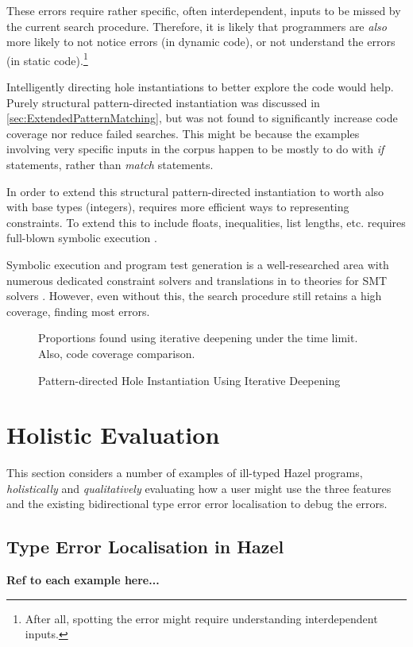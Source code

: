 These errors require rather specific, often interdependent, inputs to be missed by the current search procedure. Therefore, it is likely that programmers are \textit{also} more likely to not notice errors (in dynamic code), or not understand the errors (in static code).\footnote{After all, spotting the error might require understanding interdependent inputs.}

Intelligently directing hole instantiations to better explore the code would help. Purely structural pattern-directed instantiation was discussed in \cref{sec:ExtendedPatternMatching}, but was not found to significantly increase code coverage nor reduce failed searches. This might be because the examples involving very specific inputs in the corpus happen to be mostly to do with \textit{if} statements, rather than \textit{match} statements.

In order to extend this structural pattern-directed instantiation to worth also with base types (integers), requires more efficient ways to representing constraints. To extend this to include floats, inequalities, list lengths, etc. requires full-blown symbolic execution \cite{SymbolicExecutionSurvey}. 

Symbolic execution and program test generation is a well-researched area with numerous dedicated constraint solvers \cite{CITE MANY HERE} and translations in to theories for SMT solvers \cite{CITE SMTS HERE}. However, even without this, the search procedure still retains a high coverage, finding most errors.

\begin{figure}\centering
Proportions found using iterative deepening under the time limit. Also, code coverage comparison.
\caption{Pattern-directed Hole Instantiation Using Iterative Deepening}
\end{figure}

\section{Holistic Evaluation}
\label{sec:CognitiveWalkthrough}

This section considers a number of examples of ill-typed Hazel programs, \textit{holistically} and \textit{qualitatively} evaluating how a user might use the three features and the existing bidirectional type error error localisation \cite{HazelErrors} to debug the errors. 


\subsection{Type Error Localisation in Hazel}
\textbf{Ref to each example here...}

